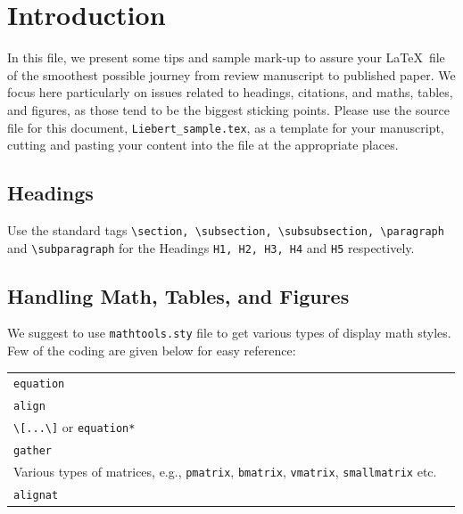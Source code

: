 \documentclass[]{Liebert_Author}
\begin{document}
\section{Introduction}

In this file, we present some tips and sample mark-up to assure your
\LaTeX\ file of the smoothest possible journey from review manuscript
to published paper.  We focus here particularly on
issues related to headings, citations, and maths, tables, and
figures, as those tend to be the biggest sticking points.  Please use
the source file for this document, \texttt{Liebert\_sample.tex}, as a template
for your manuscript, cutting and pasting your content into the file at
the appropriate places.

\subsection{Headings}

Use the standard tags \verb!\section, \subsection, \subsubsection, \paragraph! and \verb!\subparagraph! for the Headings \verb!H1, H2, H3, H4! and \verb!H5! respectively.

\subsection{Handling Math, Tables, and Figures}

We suggest to use \verb!mathtools.sty! file to get various types of
display math styles. Few of the coding are given below for easy
reference:

\bigskip

\noindent\begin{tabular}{@{}ll}
\toprule
\verb!equation!\\
\verb!align!\\
\verb!\[...\]! or \verb!equation*!\\
\verb!gather!\\
Various types of matrices, e.g., \verb!pmatrix!, \verb!bmatrix!,
\verb!vmatrix!, \verb!smallmatrix! etc.\\
\verb!alignat!\\
\bottomrule
\end{tabular}
\end{document}
